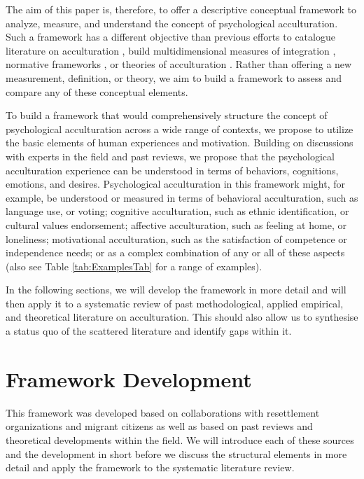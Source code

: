 \documentclass[man, 12pt, a4paper]{apa7}
\begin{document}
The aim of this paper is, therefore, to offer a descriptive conceptual framework to analyze, measure, and understand the concept of psychological acculturation. Such a framework has a different objective than previous efforts to catalogue literature on acculturation \citep[e.g.,][]{Castels2003}, build multidimensional measures of integration \citep[e.g.,][]{Harder2018}, normative frameworks \citep[e.g.,][]{Ager2008a}, or theories of acculturation \citep[e.g.,][]{Berry2005}. Rather than offering a new measurement, definition, or theory, we aim to build a framework to assess and compare any of these conceptual elements. 

To build a framework that would comprehensively structure the concept of psychological acculturation across a wide range of contexts, we propose to utilize the basic elements of human experiences and motivation.
Building on discussions with experts in the field and past reviews, we propose that the psychological acculturation experience can be understood in terms of behaviors, cognitions, emotions, and desires. Psychological acculturation in this framework might, for example, be understood or measured in terms of behavioral acculturation, such as language use, or voting; cognitive acculturation, such as ethnic identification, or cultural values endorsement; affective acculturation, such as feeling at home, or loneliness; motivational acculturation, such as the satisfaction of competence or independence needs; or as a complex combination of any or all of these aspects (also see Table \ref{tab:ExamplesTab} for a range of examples). 

In the following sections, we will develop the framework in more detail and will then apply it to a systematic review of past methodological, applied empirical, and theoretical literature on acculturation. This should also allow us to synthesise a status quo of the scattered literature and identify gaps within it.



\section{Framework Development} 

This framework was developed based on collaborations with resettlement organizations and migrant citizens as well as based on past reviews and theoretical developments within the field. We will introduce each of these sources and the development in short before we discuss the structural elements in more detail and apply the framework to the systematic literature review.
\end{document}
